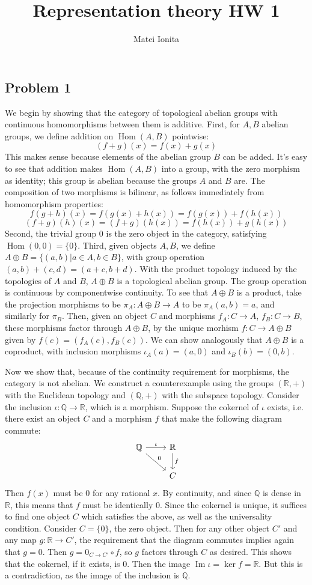 \documentclass[12 pt]{article}
\title{Representation theory HW 1}
\author{Matei Ionita}
\newcommand{\R}{\mathbb{R}}
\newcommand{\Q}{\mathbb{Q}}
\DeclareMathOperator{\Hom}{Hom}
\DeclareMathOperator {\imag} {Im}
\begin{document}
  \maketitle


\subsection*{Problem 1}
We begin by showing that the category of topological abelian groups with continuous homomorphisms between them is additive. First, for $A,B$ abelian groups, we define addition on $\Hom(A,B)$ pointwise:
\[     (f + g) (x) = f(x) + g(x)    \]
This makes sense because elements of the abelian group $B$ can be added. It's easy to see that addition makes $\Hom(A,B)$ into a group, with the zero morphism as identity; this group is abelian because the groups $A$ and $B$ are. The composition of two morphisms is bilinear, as follows immediately from homomorphism properties:
\[        f(g+h) (x) = f(g(x) + h(x)) = f(g(x)) + f(h(x))      \]
\[          (f + g) (h) (x) = (f+g)(h(x)) = f(h(x)) + g(h(x))     \]
Second, the trivial group 0 is the zero object in the category, satisfying $\Hom(0,0) = \{0\}$. Third, given objects $A, B$, we define $A \oplus B = \{ (a,b) | a\in A, b \in B \}$, with group operation $(a, b) + (c,d) = (a+c, b+d)$. With the product topology induced by the topologies of $A$ and $B$, $A \oplus B$ is a topological abelian group. The group operation is continuous by componentwise continuity. To see that $A \oplus B$ is a product, take the projection morphisms to be $\pi_A : A \oplus B \to A$ to be $\pi_A (a,b) = a$, and similarly for $\pi_B$. Then, given an object $C$ and morphisms $f_A : C \to A$, $f_B : C \to B$, these morphisms factor through $A \oplus B$, by the unique morhism $f: C \to A \oplus B$ given by $f(c) = (f_A(c), f_B(c))$. We can show analogously that $A\oplus B$ is a coproduct, with inclusion morphisms $\iota_A (a) = (a,0)$ and $\iota_B (b) = (0,b)$.

Now we show that, because of the continuity requirement for morphisms, the category is not abelian. We construct a counterexample using the groups $(\R, +)$ with the Euclidean topology and $(\Q, +)$ with the subspace topology. Consider the inclusion $\iota : \Q \to \R$, which is a morphism. Suppose the cokernel of $\iota$ exists, i.e. there exist an object $C$ and a morphism $f$ that make the following diagram commute:
\[
\begin{tikzcd}
\Q \arrow{r}{\iota}\arrow{dr}{0} & \R\arrow{d}{f} \\
& C
\end{tikzcd}
\]
Then $f(x)$ must be 0 for any rational $x$. By continuity, and since $\Q$ is dense in $\R$, this means that $f$ must be identically 0. Since the cokernel is unique, it suffices to find one object $C$ which satisfies the above, as well as the universality condition. Consider $C = \{0\}$, the zero object. Then for any other object $C'$ and any map $g : \R \to C'$, the requirement that the diagram commutes implies again that $g = 0$. Then $g = 0_{C \to C'} \circ f$, so $g$ factors through $C$ as desired. This shows that the cokernel, if it exists, is $0$. Then the image $\imag \iota = \ker f = \R$. But this is a contradiction, as the image of the inclusion is $\Q$.
\end{document}
